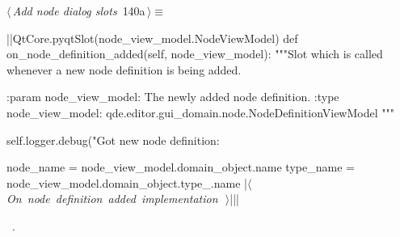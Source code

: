 \documentclass[%
    a4paper,    %
    justified,  %
    nobib,      %
    openany     %
]{tufte-book}
\begin{document}
\begin{flushleft} \small
\begin{minipage}{\linewidth}\label{scrap153}\raggedright\small
{} $\langle\,${\itshape Add node dialog slots}\nobreak\ {\footnotesize {140a}}$\,\rangle\equiv$
\vspace{-1ex}
\begin{pythoncode}
|\normalfont{}\fontfamily{}|QtCore.pyqtSlot(node_view_model.NodeViewModel)
def on_node_definition_added(self, node_view_model):
    """Slot which is called whenever a new node definition is being added.

    :param node_view_model: The newly added node definition.
    :type  node_view_model: qde.editor.gui_domain.node.NodeDefinitionViewModel
    """

    self.logger.debug("Got new node definition: %

    node_name = node_view_model.domain_object.name
    type_name = node_view_model.domain_object.type_.name
    |\hbox{$\langle\,${\itshape On node definition added implementation}\nobreak\ {\footnotesize {}}$\,\rangle$}||\NWsep|
\end{pythoncode}
\vspace{1.5ex}
\footnotesize
\begin{list}{}{\setlength{\itemsep}{-\parsep}\setlength{\itemindent}{-\leftmargin}}
\item \NWtxtMacroRefIn\ .

\item{}
\end{list}
\end{minipage}\vspace{4ex}
\end{flushleft}
%
\end{document}
